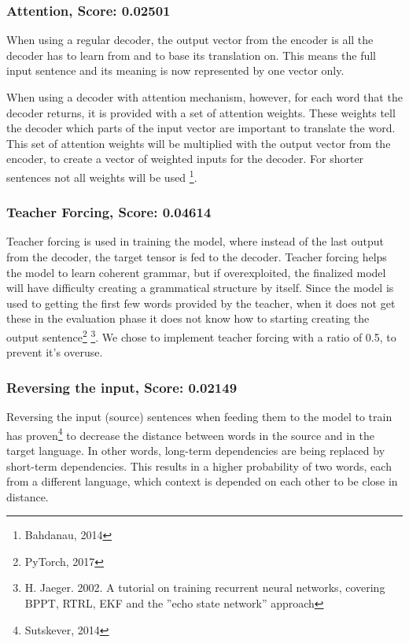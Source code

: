 \documentclass[11pt]{article}
\begin{document}
\subsubsection*{Attention, Score: 0.02501}
When using a regular decoder, the output vector from the encoder is all the decoder has to learn from and to base its translation on. This means the full input sentence and its meaning is now represented by one vector only.

When using a decoder with attention mechanism, however, for each word that the decoder returns, it is provided with a set of attention weights. These weights tell the decoder which parts of the input vector are important to translate the word. This set of attention weights will be multiplied with the output vector from the encoder, to create a vector of weighted inputs for the decoder. For shorter sentences not all weights will be used \footnote[7]{Bahdanau, 2014}. 

\subsubsection*{Teacher Forcing, Score: 0.04614}
Teacher forcing is used in training the model, where instead of the last output from the decoder, the target tensor is fed to the decoder. Teacher forcing helps the model to learn coherent grammar, but if overexploited, the finalized model will have difficulty creating a grammatical structure by itself. Since the model is used to getting the first few words provided by the teacher, when it does not get these in the evaluation phase it does not know how to starting creating the output sentence\footnote[8]{PyTorch, 2017} \footnote[9]{ H. Jaeger. 2002. A tutorial on training recurrent neural networks, covering BPPT, RTRL, EKF and the ”echo state network” approach}. We chose to implement teacher forcing with a ratio of 0.5, to prevent it's overuse.

\subsubsection*{Reversing the input, Score: 0.02149}
Reversing the input (source) sentences when feeding them to the model to train has proven\footnote[10]{Sutskever, 2014} to decrease the distance between words in the source and in the target language. In other words, long-term dependencies are being replaced by short-term dependencies. This results in a higher probability of two words, each from a different language, which context is depended on each other to be close in distance.
\end{document}
